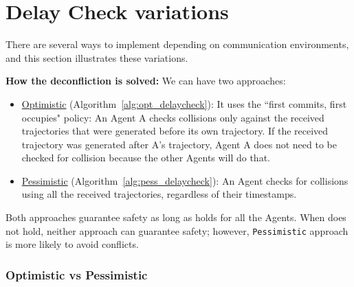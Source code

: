 \begin{figure}[h]
{\begin{tikzpicture}
    \end{tikzpicture}
    }
    
  \label{fig:wo_check_rmader_deconfliction}
\end{figure}

\section{Delay Check variations}

There are several ways to implement \DelayCheckStep{} depending on communication environments, and this section illustrates these variations.


\textbf{How the deconfliction is solved:} We can have two approaches:
\begin{itemize}
    \item \underline{Optimistic} (Algorithm~\ref{alg:opt_delaycheck}): It uses the ``first commits, first occupies" policy: An Agent A checks collisions only against the received trajectories that were generated before its own trajectory. If the received trajectory was generated after A's trajectory, Agent A does not need to be checked for collision because the other Agents will do that. 
    \item \underline{Pessimistic} (Algorithm~\ref{alg:pess_delaycheck}): An Agent checks for collisions using all the received trajectories, regardless of their timestamps. 

\end{itemize}

Both approaches guarantee safety as long as \NeccessaryCond{} holds for all the Agents. When \NeccessaryCond{} does not hold, neither approach can guarantee safety; however, {\tt Pessimistic} approach is more likely to avoid conflicts.

\subsubsection{Optimistic vs Pessimistic}


